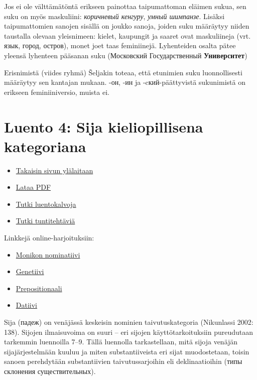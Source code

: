 \documentclass[]{scrartcl}
\providecommand{\tightlist}{%
  \setlength{\itemsep}{0pt}\setlength{\parskip}{0pt}}
\begin{document}
Jos ei ole välttämätöntä erikseen painottaa taipumattoman eläimen sukua,
sen suku on myös maskuliini: \emph{коричневый кенгуру}, \emph{умный
шимпанзе}. Lisäksi taipumattomien sanojen sisällä on joukko sanoja,
joiden suku määräytyy niiden taustalla olevaan yleisnimeen: kielet,
kaupungit ja saaret ovat maskuliineja (vrt. язык, город, остров), monet
joet taas feminiinejä. Lyhenteiden osalta pätee yleensä lyhenteen
pääsanan suku (Московский Государственный \textbf{Университет})

Erisnimistä (viides ryhmä) Šeljakin toteaa, että etunimien suku
luonnollisesti määräytyy sen kantajan mukaan. -он, -ин ja
-cкий-päättyvistä sukunimistä on erikseen feminiiniversio, muista ei.

\section{Luento 4: Sija kieliopillisena
kategoriana}\label{luento-4-sija-kieliopillisena-kategoriana}

\begin{itemize}
\tightlist
\item
  \href{https://mustikka.uta.fi/~juho_harme/morfologia/\#tästä-kurssista}{Takaisin
  sivun ylälaitaan}
\item
  \href{http://mustikka.uta.fi/~juho_harme/morfologia/materiaalit/luento4.pdf}{Lataa
  PDF}
\item
  \href{http://mustikka.uta.fi/~juho_harme/morfologia/presentations/luento4.html}{Tutki
  luentokalvoja}
\item
  \href{http://mustikka.uta.fi/~juho_harme/morfologia/tehtavat/luento4.pdf}{Tutki
  tuntitehtäviä}
\end{itemize}

Linkkejä online-harjoituksiin:

\begin{itemize}
\tightlist
\item
  \href{http://www.auburn.edu/~mitrege/russian/exercises/0018g.html}{Monikon
  nominatiivi}
\item
  \href{http://www.auburn.edu/~mitrege/russian/exercises/0095.html}{Genetiivi}
\item
  \href{http://www.auburn.edu/~mitrege/russian/exercises/0033.html}{Prepositionaali}
\item
  \href{http://www.auburn.edu/~mitrege/russian/exercises/0049.html}{Datiivi}
\end{itemize}

Sija (падеж) on venäjässä keskeisin nominien taivutuskategoria
(Nikunlassi 2002: 138). Sijojen ilmaisuvoima on suuri -- eri sijojen
käyttötarkoituksiin pureudutaan tarkemmin luennoilla 7--9. Tällä
luennolla tarkastellaan, mitä sijoja venäjän sijajärjestelmään kuuluu ja
miten substantiiveista eri sijat muodostetaan, toisin sanoen perehdytään
substantiivien taivutussarjoihin eli deklinaatioihin (типы склонения
существительных).
\end{document}
